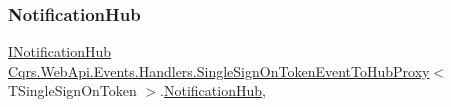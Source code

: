 \subsubsection{\texorpdfstring{Notification\+Hub}{NotificationHub}}
{\footnotesize\ttfamily \hyperlink{interfaceCqrs_1_1WebApi_1_1SignalR_1_1Hubs_1_1INotificationHub}{I\+Notification\+Hub} \hyperlink{classCqrs_1_1WebApi_1_1Events_1_1Handlers_1_1SingleSignOnTokenEventToHubProxy}{Cqrs.\+Web\+Api.\+Events.\+Handlers.\+Single\+Sign\+On\+Token\+Event\+To\+Hub\+Proxy}$<$ T\+Single\+Sign\+On\+Token $>$.\hyperlink{classCqrs_1_1WebApi_1_1SignalR_1_1Hubs_1_1NotificationHub}{Notification\+Hub}\hspace{0.3cm}{\ttfamily [get]}, {\ttfamily [protected]}}


